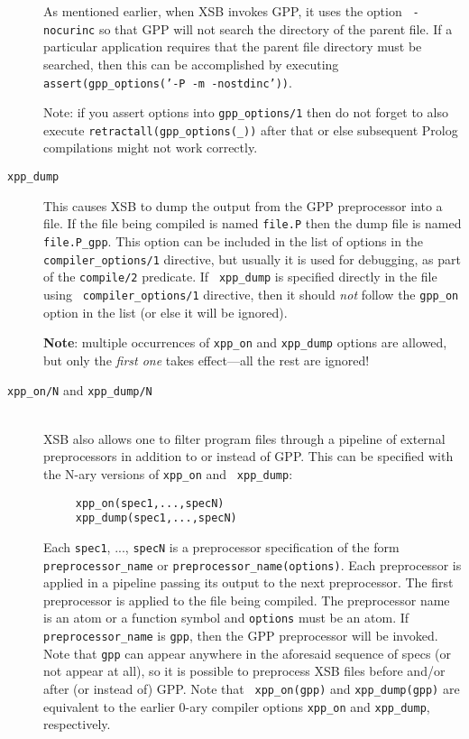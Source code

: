 \begin{description}
  As mentioned earlier, when XSB invokes GPP, it uses the option {\tt
    -nocurinc} so that GPP will not search the directory of the parent
  file.  If a particular application requires that the parent file
  directory must be searched, then this can be accomplished by
  executing {\tt assert(gpp\_options('-P -m -nostdinc'))}.
  
  Note: if you assert options into \texttt{gpp\_options/1} then do not
  forget to
  also execute \texttt{retractall(gpp\_options(\_))} after that or else
  subsequent Prolog compilations might not work correctly.
  
\item[{\tt xpp\_dump}] 
  This causes XSB to dump the output from the GPP preprocessor into a file.
  If the file being compiled is named {\tt file.P} then the dump file is
  named {\tt file.P\_gpp}. This option can be included in the list of
  options in the {\tt compiler\_options/1} directive, but usually it is
  used for debugging, as part of the {\tt compile/2} predicate. If {\tt
    xpp\_dump} is specified directly in the file using {\tt
    compiler\_options/1} directive, then it should \emph{not} follow the
  {\tt gpp\_on} option in the list (or else it will be ignored).

  {\bf Note}: multiple occurrences of {\tt xpp\_on} and {\tt xpp\_dump}
  options are allowed, but only the \emph{first one} takes effect---all the
  rest are ignored!  


\item[{\tt xpp\_on/N} and {\tt xpp\_dump/N}]
  ~\\
  XSB also allows one to filter program files through a pipeline of external
  preprocessors in addition to or instead of GPP.
  This can be specified with the N-ary versions of {\tt xpp\_on} and {\tt
    xpp\_dump}:
\begin{verbatim}
     xpp_on(spec1,...,specN)  
     xpp_dump(spec1,...,specN)  
\end{verbatim}
  Each {\tt spec1}, ..., {\tt specN} is a preprocessor specification of
  the form {\tt preprocessor\_name} or {\tt preprocessor\_name(options)}.
  Each preprocessor is applied in a pipeline passing its output to the next
  preprocessor. The first preprocessor is applied to the file being
  compiled.
  The preprocessor name is an atom or a function symbol and {\tt options}
  must be an atom. If {\tt preprocessor\_name} is {\tt gpp}, then the GPP
  preprocessor will be invoked. Note that {\tt gpp} can appear anywhere in
  the aforesaid sequence of specs (or not appear at all), so it is possible to preprocess
  XSB files before and/or after (or instead of) GPP. Note that {\tt
    xpp\_on(gpp)}  and {\tt xpp\_dump(gpp)} are equivalent to the earlier
  0-ary compiler options {\tt xpp\_on}
  and {\tt xpp\_dump}, respectively. 


\end{description}
